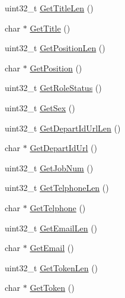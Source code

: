 \begin{DoxyCompactItemize}
uint32\+\_\+t \hyperlink{class_c_im_pdu_login_response_a61f82148d5d6b00aa9d483f0445b7909}{Get\+Title\+Len} ()
\item 
char $\ast$ \hyperlink{class_c_im_pdu_login_response_abdc150920f57e1d36bf17b5aa3f5d3ad}{Get\+Title} ()
\item 
uint32\+\_\+t \hyperlink{class_c_im_pdu_login_response_ace72db49eb816fa9f6958451f0710277}{Get\+Position\+Len} ()
\item 
char $\ast$ \hyperlink{class_c_im_pdu_login_response_aa898373388766044ae42dd7bc1412db7}{Get\+Position} ()
\item 
uint32\+\_\+t \hyperlink{class_c_im_pdu_login_response_a13284c3099533ee0a9a66727fc9f1d64}{Get\+Role\+Status} ()
\item 
uint32\+\_\+t \hyperlink{class_c_im_pdu_login_response_a61758cf076ddf4d09ae2d60e47c7d753}{Get\+Sex} ()
\item 
uint32\+\_\+t \hyperlink{class_c_im_pdu_login_response_ac6a438b143f6598b3f9bb6f52495c705}{Get\+Depart\+Id\+Url\+Len} ()
\item 
char $\ast$ \hyperlink{class_c_im_pdu_login_response_a70ecd1965c6a432754d778c435d9b290}{Get\+Depart\+Id\+Url} ()
\item 
uint32\+\_\+t \hyperlink{class_c_im_pdu_login_response_aea01d7ca7d1d0f1fb78a601566028dcf}{Get\+Job\+Num} ()
\item 
uint32\+\_\+t \hyperlink{class_c_im_pdu_login_response_a2762f3f87264c84c4036f365a46de10d}{Get\+Telphone\+Len} ()
\item 
char $\ast$ \hyperlink{class_c_im_pdu_login_response_a0f23013d77ace54b5e0e17912ca56804}{Get\+Telphone} ()
\item 
uint32\+\_\+t \hyperlink{class_c_im_pdu_login_response_abd8335d6f7200bdffe889840a8e42d00}{Get\+Email\+Len} ()
\item 
char $\ast$ \hyperlink{class_c_im_pdu_login_response_a4d96378e265a70477981bb7691ab5b10}{Get\+Email} ()
\item 
uint32\+\_\+t \hyperlink{class_c_im_pdu_login_response_af23155890e745f4b223c894d6c0835b8}{Get\+Token\+Len} ()
\item 
char $\ast$ \hyperlink{class_c_im_pdu_login_response_a5fb06b167e164e3e7c0b4de441eaa1d0}{Get\+Token} ()
\end{DoxyCompactItemize}
